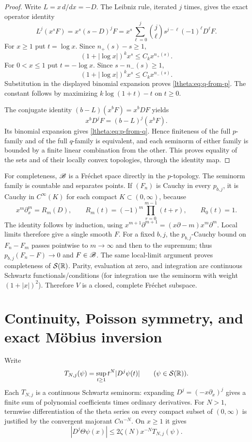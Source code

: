 \begin{proof}
Write $L=x\,d/dx=-D$. The Leibniz rule, iterated $j$ times, gives the
exact operator identity
\[
 L^j(x^sF)=x^s(s-D)^jF
   =x^s\sum_{\ell=0}^j\binom j\ell s^{j-\ell}(-1)^\ell D^\ell F.
\]
For $x\geq1$ put $t=\log x$. Since $n_+(s)-s\geq1$,
\[
 (1+|\log x|)^kx^s\leq C_kx^{n_+(s)}.
\]
For $0<x\leq1$ put $t=-\log x$. Since $s-n_-(s)\geq1$,
\[
 (1+|\log x|)^kx^s\leq C_kx^{n_-(s)}.
\]
Substitution in the displayed binomial expansion proves
\eqref{ltheta:eq:q-from-p}. The constant follows by maximizing
$k\log(1+t)-t$ on $t\geq0$.

The conjugate identity $(b-L)(x^bF)=x^bDF$ yields
\[
 x^bD^jF=(b-L)^j(x^bF).
\]
Its binomial expansion gives \eqref{ltheta:eq:p-from-q}. Hence finiteness of
the full $p$-family and of the full $q$-family is equivalent, and each
seminorm of either family is bounded by a finite linear combination
from the other. This proves equality of the sets and of their locally
convex topologies, through the identity map.
\end{proof}

For completeness, $\mathscr B$ is a Fr\'echet space directly in the $p$-topology.
The seminorm family is countable and separates points. If $(F_n)$ is
Cauchy in every $p_{b,j}$, it is Cauchy in $C^\infty(K)$ for each compact
$K\subset(0,\infty)$, because
\begin{equation}\label{ltheta:eq:R}
 x^m\partial_x^m=R_m(D),\qquad
 R_m(t)=(-1)^m\prod_{r=0}^{m-1}(t+r),\qquad R_0(t)=1.
\end{equation}
The identity follows by induction, using
$x^{m+1}\partial^{m+1}=(x\partial-m)x^m\partial^m$.
Local limits therefore give a single smooth $F$. For a fixed $b,j$,
the $p_{b,j}$-Cauchy bound on $F_n-F_m$ passes pointwise to $m\to\infty$
and then to the supremum; thus $p_{b,j}(F_n-F)\to0$ and $F\in\mathscr B$.
The same local-limit argument proves completeness of $\mathcal S(\mathbb R)$.
Parity, evaluation at zero, and integration are continuous Schwartz
functionals/conditions (for integration use the seminorm with weight
$(1+|x|)^2$). Therefore $V$ is a closed, complete Fr\'echet subspace.

\section{Continuity, Poisson symmetry, and exact M\"obius inversion}

Write
\[
 T_{N,j}(\psi)=\sup_{t\geq1}t^N|D^j\psi(t)|
 \qquad(\psi\in\mathcal S(\mathbb R)).
\]
Each $T_{N,j}$ is a continuous Schwartz seminorm: expanding
$D^j=(-x\partial_x)^j$ gives a finite sum of polynomial coefficients
times ordinary derivatives. For $N>1$, termwise differentiation of
the theta series on every compact subset of $(0,\infty)$ is justified
by the convergent majorant $C n^{-N}$. On $x\geq1$ it gives
\begin{equation}\label{ltheta:eq:theta-tail}
 |D^j\Theta\psi(x)|\leq2\zeta(N)x^{-N}T_{N,j}(\psi).
\end{equation}


